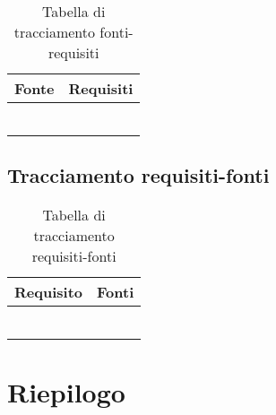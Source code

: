 \documentclass[AnalisiDeiRequisiti.tex]{subfiles}
\begin{document}
\label{table:Tabella di tracciamento fonti-requisiti}
\begin{longtable}[H]{|p{5cm}|p{8cm}|}
	\hline
	\rowcolor[HTML]{38FFF8} 
	\textbf{Fonte} & \textbf{Requisiti} \\ \hline
	\endhead
	&  \\ \hline
	&  \\ \hline
	&  \\ \hline
	&  \\ \hline
	&  \\ \hline
	\caption{Tabella di tracciamento fonti-requisiti}
\end{longtable}

\subsection{Tracciamento requisiti-fonti}

\label{table:Tabella di tracciamento requisiti-fonti}
\begin{longtable}[H]{|p{5cm}|p{8cm}|}
	\hline
	\rowcolor[HTML]{38FFF8} 
	\textbf{Requisito} & \textbf{Fonti} \\ \hline
	\endhead
	&  \\ \hline
	&  \\ \hline
	&  \\ \hline
	&  \\ \hline
	&  \\ \hline
	\caption{Tabella di tracciamento requisiti-fonti}
\end{longtable}

\section{Riepilogo}
\end{document}
